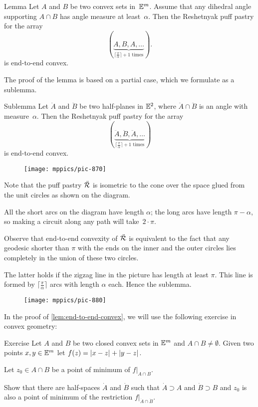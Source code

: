 \begin{thm}{Lemma}\label{lem:end-to-end-convex}
Let $A$ and $B$ be two convex sets in~$\mathbb{E}^m$.
Assume that any dihedral angle supporting $A\cap B$ has angle measure at least~$\alpha$.
Then the Reshetnyak puff pastry for the array
\[(\underbrace{A,B,A,\dots}_{\text{$\lceil\tfrac\pi\alpha\rceil+1$ times}}).\]
is end-to-end convex. 
\end{thm}


The proof of the lemma is based on a partial case,
which we formulate as a sublemma.

\begin{thm}{Sublemma}\label{sublem:end-to-end-convex}
Let $\ddot A$ and $\ddot B$ be two  
half-planes in $\mathbb{E}^2$, where $\ddot A\cap \ddot B$ is an angle with measure~$\alpha$.
Then the Reshetnyak puff pastry for the array \[(\underbrace{\ddot A,\ddot B,\ddot A,\dots}_{\text{$\lceil\tfrac\pi\alpha\rceil+1$ times}})\]
is end-to-end convex. 
\end{thm}

\begin{wrapfigure}{r}{35mm}
\vskip0mm
\centering
\texttt{[image: mppics/pic-870]}
\end{wrapfigure}

Note that the puff pastry $\ddot{\mathcal{R}}$ is isometric to the cone over the space glued from the unit circles as shown on the diagram.

All the short arcs on the diagram have length $\alpha$;
the long arcs have length $\pi-\alpha$,
so making a circuit along any path will take~$2\cdot\pi$.

Observe that end-to-end convexity of $\ddot{\mathcal{R}}$
is equivalent to the fact that any geodesic shorter than $\pi$ with the ends on the inner and the outer circles lies completely in the union of these two circles.

The latter holds if the zigzag line in the picture has length at least $\pi$.
This line is formed by $\lceil\tfrac\pi\alpha\rceil$ arcs with length $\alpha$ each.
Hence the sublemma.
\qeds

{

\begin{wrapfigure}{r}{25mm}
\vskip-3mm
\centering
\texttt{[image: mppics/pic-880]}
\end{wrapfigure}

In the proof of \ref{lem:end-to-end-convex}, we will use the following exercise in convex geometry:

\begin{thm}{Exercise}\label{ex:supporting-planes}
Let $A$ and $B$ be two closed convex sets in $\mathbb{E}^m$ and $A\cap B\ne\emptyset$.
Given two points $x,y\in \mathbb{E}^m$  let $f(z)=\dist{x}{z}{}+\dist{y}{z}{}$.

Let $z_0\in A\cap B$ be  a point of minimum of $f|_{A\cap B}$.

Show that there are half-spaces $\dot A$ and $\dot B$ such that
$\dot A\supset A$ and $\dot B\supset B$
and $z_0$ is also a point of minimum of the restriction $f|_{\dot A\cap \dot B}$.

\end{thm}

}

